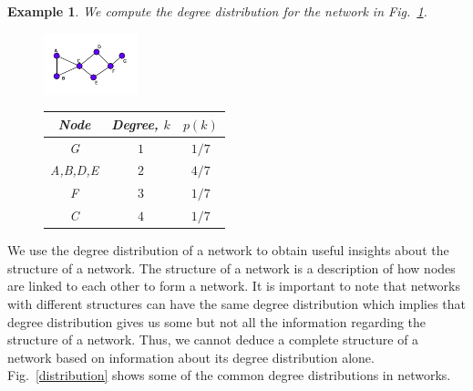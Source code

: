\documentclass[10pt,a4paper]{article}
\newtheorem{exa}{Example}
\begin{document}
\begin{exa} We compute the degree distribution for the network in Fig.~\ref{deg-distb}.
	
	\begin{figure}[H]
		\centering
		\begin{minipage}[t]{.30\textwidth}
			\centering
			\vspace{0pt}
			\includegraphics[width=\textwidth]{images/degree-prob.pdf}
			\label{deg-distb}
		\end{minipage}
		\hfill
		\begin{minipage}[t]{.64\textwidth}
			\centering
			\vspace{0pt}
			\setlength{\tabcolsep}{15pt}
			\renewcommand{\arraystretch}{1.2}
			\begin{tabular}{|c|c|c|}
				\hline 
				Node & Degree, $k$ & $p(k)$ \\
				\hline
				G & $1$ & $1/7$ \\
				A,B,D,E & $2$ & $4/7$ \\
				F & $3$ & $1/7$ \\
				C & $4$ & $1/7$ \\
				\hline
			\end{tabular}
		\end{minipage}
	\end{figure}
\end{exa}

We use the degree distribution of a network to obtain useful insights about the structure of a network. The structure of a network is a description of how nodes are linked to each other to form a network. It is important to note that networks with different structures can have the same degree distribution which implies that degree distribution gives us some but not all the information regarding the structure of a network. Thus, we cannot deduce a complete structure of a network based on information about its degree distribution alone. Fig.~\ref{distribution} shows some of the common degree distributions in networks.
\end{document}

